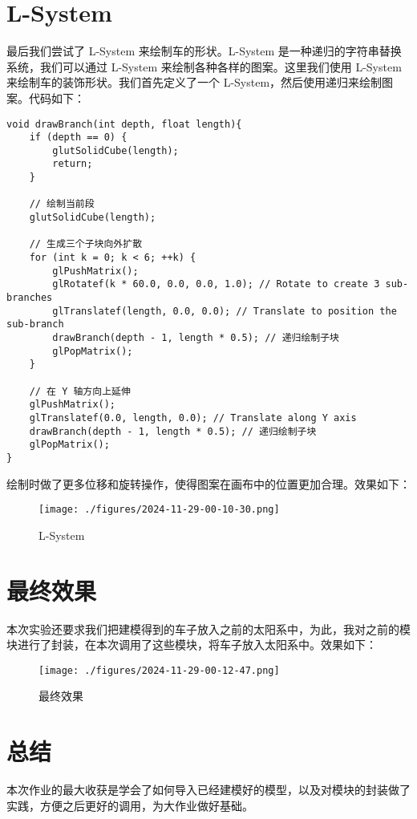 \documentclass[12pt,hyperref,a4paper,UTF8]{ctexart}
\begin{document}
\section{L-System}
最后我们尝试了 L-System 来绘制车的形状。L-System 是一种递归的字符串替换系统，我们可以通过 L-System 来绘制各种各样的图案。这里我们使用 L-System 来绘制车的装饰形状。我们首先定义了一个 L-System，然后使用递归来绘制图案。代码如下：

\begin{verbatim}
void drawBranch(int depth, float length){
    if (depth == 0) {
        glutSolidCube(length);
        return;
    }

    // 绘制当前段
    glutSolidCube(length);

    // 生成三个子块向外扩散
    for (int k = 0; k < 6; ++k) {
        glPushMatrix();
        glRotatef(k * 60.0, 0.0, 0.0, 1.0); // Rotate to create 3 sub-branches
        glTranslatef(length, 0.0, 0.0); // Translate to position the sub-branch
        drawBranch(depth - 1, length * 0.5); // 递归绘制子块
        glPopMatrix();
    }

    // 在 Y 轴方向上延伸
    glPushMatrix();
    glTranslatef(0.0, length, 0.0); // Translate along Y axis
    drawBranch(depth - 1, length * 0.5); // 递归绘制子块
    glPopMatrix();
}
\end{verbatim}

绘制时做了更多位移和旋转操作，使得图案在画布中的位置更加合理。效果如下：

\begin{figure}[H]
    \centering
    \texttt{[image: ./figures/2024-11-29-00-10-30.png]}
    \caption{L-System}
\end{figure}

\section{最终效果}

本次实验还要求我们把建模得到的车子放入之前的太阳系中，为此，我对之前的模块进行了封装，在本次调用了这些模块，将车子放入太阳系中。效果如下：

\begin{figure}[H]
    \centering
    \texttt{[image: ./figures/2024-11-29-00-12-47.png]}
    \caption{最终效果}
\end{figure}

\section{总结}
本次作业的最大收获是学会了如何导入已经建模好的模型，以及对模块的封装做了实践，方便之后更好的调用，为大作业做好基础。
\end{document}
